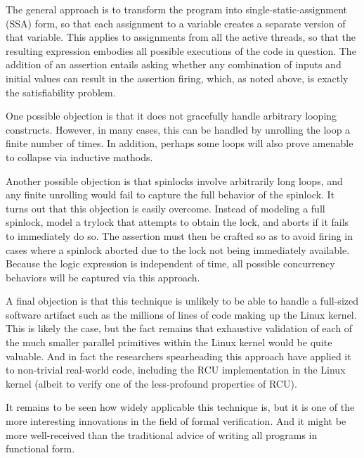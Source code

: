 The general approach is to transform the program into single-static-assignment
(SSA) form, so that each assignment to a variable creates a separate
version of that variable.
This applies to assignments from all the active threads, so that the
resulting expression embodies all possible executions of the code
in question.
The addition of an assertion entails asking whether any combination of
inputs and initial values can result in the assertion firing, which,
as noted above, is exactly the satisfiability problem.

One possible objection is that it does not gracefully handle arbitrary
looping constructs.
However, in many cases, this can be handled by unrolling the loop a
finite number of times.
In addition, perhaps some loops will also prove amenable to collapse
via inductive mathods.

Another possible objection is that spinlocks involve arbitrarily long
loops, and any finite unrolling would fail to capture the full behavior
of the spinlock.
It turns out that this objection is easily overcome.
Instead of modeling a full spinlock, model a trylock that attempts to
obtain the lock, and aborts if it fails to immediately do so.
The assertion must then be crafted so as to avoid firing in cases
where a spinlock aborted due to the lock not being immediately available.
Because the logic expression is independent of time, all possible
concurrency behaviors will be captured via this approach.

A final objection is that this technique is unlikely to be able to handle
a full-sized software artifact such as the millions of lines of code making
up the Linux kernel.
This is likely the case, but the fact remains that exhaustive validation
of each of the much smaller parallel primitives within the Linux kernel
would be quite valuable.
And in fact the researchers spearheading this approach have applied it
to non-trivial real-world code, including the RCU implementation in
the Linux kernel (albeit to verify one of the less-profound properties
of RCU).

It remains to be seen how widely applicable this technique is, but
it is one of the more interesting innovations in the field of
formal verification.
And it might be more well-received than the traditional advice of
writing all programs in functional form.
